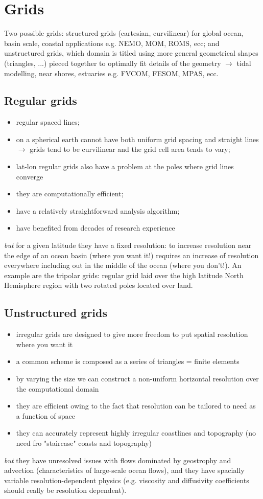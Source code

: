 \chapter{Grids}
Two possible grids: structured grids (cartesian, curvilinear) for global ocean, basin scale, coastal applications e.g. NEMO, MOM, ROMS, ecc; and unstructured grids, which domain is titled using more general geometrical shapes (triangles, ...) pieced together to optimally fit details of the geometry $\rightarrow$ tidal modelling, near shores, estuaries e.g. FVCOM, FESOM, MPAS, ecc.
\section{Regular grids}
\begin{itemize}
	\item regular spaced lines;
	\item on a spherical earth cannot have both uniform grid spacing and straight lines $\rightarrow$ grids tend to be curvilinear and the grid cell area tends to vary;
	\item lat-lon regular grids also have a problem at the poles where grid lines converge
	\item they are computationally efficient;
	\item have a relatively straightforward analysis algorithm;
	\item have benefited from decades of research experience
\end{itemize}
\textit{but} for a given latitude they have a fixed resolution: to increase resolution near the edge of an ocean basin (where you want it!) requires an increase of resolution everywhere including out in the middle of the ocean (where you don't!). An example are the tripolar grids: regular grid laid over the high latitude North Hemisphere region with two rotated poles located over land.
\section{Unstructured grids}
\begin{itemize}
	\item irregular grids are designed to give more freedom to put spatial resolution where you want it
	\item a common scheme is composed as a series of triangles = finite elements
	\item by varying the size we can construct a non-uniform horizontal resolution over the computational domain
	\item they are efficient owing to the fact that resolution can be tailored to need as a function of space
	\item they can accurately represent highly irregular coastlines and topography (no need fro "staircase" coasts and topography)
\end{itemize}
\textit{but} they have unresolved issues with flows dominated by geostrophy and advection (characteristics of large-scale ocean flows), and they have spacially variable resolution-dependent physics (e.g. viscosity and diffusivity coefficients should really be resolution dependent).

